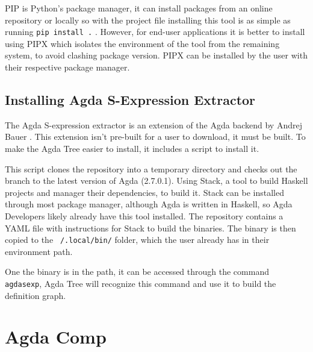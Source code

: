 PIP is Python's package manager, it can install packages from an online
repository or locally so with the project file installing this tool is as
simple as running \texttt{pip install .} . However, for end-user applications
it is better to install using PIPX which isolates the environment of the tool
from the remaining system, to avoid clashing package version. PIPX can be
installed by the user with their respective package manager.


\subsection{Installing Agda S-Expression Extractor}


The Agda S-expression extractor is an extension of the Agda backend by Andrej
Bauer \cite{andrej}. This extension isn't pre-built for a user to download, it
must be built. To make the Agda Tree easier to install, it includes a script to
install it.

This script clones the repository into a temporary directory and checks out the
branch to the latest version of Agda (2.7.0.1). Using Stack, a tool to build
Haskell projects and manager their dependencies, to build it. Stack can be
installed through most package manager, although Agda is written in Haskell, so
Agda Developers likely already have this tool installed. The repository
contains a YAML file with instructions for Stack to build the binaries. The
binary is then copied to the \texttt{~/.local/bin/} folder, which the user
already has in their environment path. 

One the binary is in the path, it can be accessed through the command
\texttt{agdasexp}, Agda Tree will recognize this command and use it to build
the definition graph.


\section{Agda Comp}

